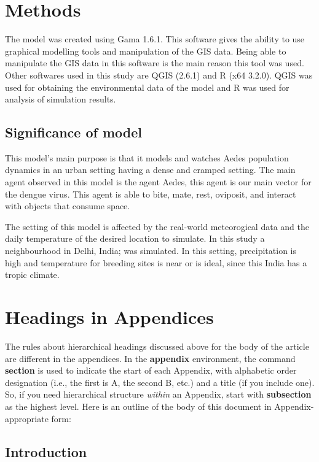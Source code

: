 \section{Methods}

The model was created using Gama 1.6.1. This software gives the ability to use graphical modelling tools and manipulation of the GIS data. Being able to manipulate the GIS data in this software is the main reason this tool was used. Other softwares used in this study are QGIS (2.6.1) and R (x64 3.2.0). QGIS was used for obtaining the environmental data of the model and R was used for analysis of simulation results.


\subsection{Significance of model}
This model's main purpose is that it models and watches Aedes population dynamics in an urban setting having a dense and cramped setting. The main agent observed in this model is the agent Aedes, this agent is our main vector for the dengue virus. This agent is able to bite, mate, rest, oviposit, and interact with objects that consume space. 

The setting of this model is affected by the real-world meteorogical data and the daily temperature of the desired location to simulate. In this study a neighbourhood in Delhi, India; was simulated. In this setting, precipitation is high and temperature for breeding sites is near or is ideal, since this India has a tropic climate.




\appendix
\section{Headings in Appendices}
The rules about hierarchical headings discussed above for
the body of the article are different in the appendices.
In the \textbf{appendix} environment, the command
\textbf{section} is used to
indicate the start of each Appendix, with alphabetic order
designation (i.e., the first is A, the second B, etc.) and
a title (if you include one).  So, if you need
hierarchical structure
\textit{within} an Appendix, start with \textbf{subsection} as the
highest level. Here is an outline of the body of this
document in Appendix-appropriate form:
\subsection{Introduction}
